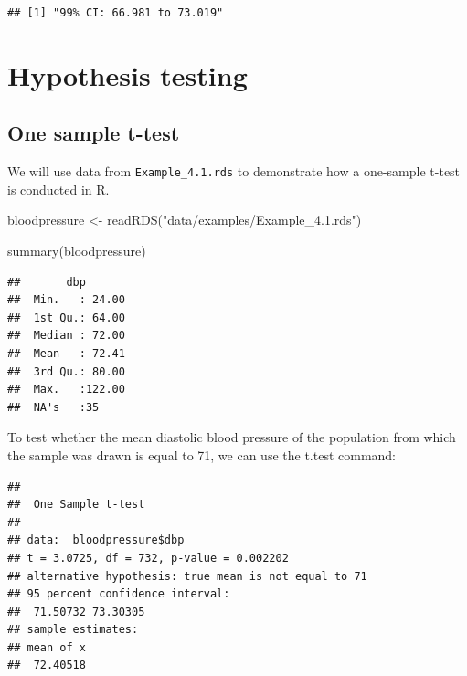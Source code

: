 \documentclass[
]{memoir}
\newenvironment{Shaded}{\begin{snugshade}}{\end{snugshade}}
\newcommand{\AttributeTok}[1]{\textcolor[rgb]{0.77,0.63,0.00}{#1}}
\newcommand{\DecValTok}[1]{\textcolor[rgb]{0.00,0.00,0.81}{#1}}
\newcommand{\FunctionTok}[1]{\textcolor[rgb]{0.00,0.00,0.00}{#1}}
\newcommand{\NormalTok}[1]{#1}
\newcommand{\OtherTok}[1]{\textcolor[rgb]{0.56,0.35,0.01}{#1}}
\newcommand{\SpecialCharTok}[1]{\textcolor[rgb]{0.00,0.00,0.00}{#1}}
\newcommand{\StringTok}[1]{\textcolor[rgb]{0.31,0.60,0.02}{#1}}
\begin{document}
\begin{verbatim}
## [1] "99% CI: 66.981 to 73.019"
\end{verbatim}

\hypertarget{hypothesis-testing}{%
\chapter{Hypothesis testing}\label{hypothesis-testing}}

\hypertarget{one-sample-t-test}{%
\section{One sample t-test}\label{one-sample-t-test}}

We will use data from \texttt{Example\_4.1.rds} to demonstrate how a one-sample t-test is conducted in R.

\begin{Shaded}
\begin{Highlighting}[]
\NormalTok{bloodpressure }\OtherTok{\textless{}{-}} \FunctionTok{readRDS}\NormalTok{(}\StringTok{"data/examples/Example\_4.1.rds"}\NormalTok{)}

\FunctionTok{summary}\NormalTok{(bloodpressure)}
\end{Highlighting}
\end{Shaded}

\begin{verbatim}
##       dbp        
##  Min.   : 24.00  
##  1st Qu.: 64.00  
##  Median : 72.00  
##  Mean   : 72.41  
##  3rd Qu.: 80.00  
##  Max.   :122.00  
##  NA's   :35
\end{verbatim}

To test whether the mean diastolic blood pressure of the population from which the sample was drawn is equal to 71, we can use the t.test command:

\begin{Shaded}
\end{Shaded}

\begin{verbatim}
## 
##  One Sample t-test
## 
## data:  bloodpressure$dbp
## t = 3.0725, df = 732, p-value = 0.002202
## alternative hypothesis: true mean is not equal to 71
## 95 percent confidence interval:
##  71.50732 73.30305
## sample estimates:
## mean of x 
##  72.40518
\end{verbatim}
\end{document}
